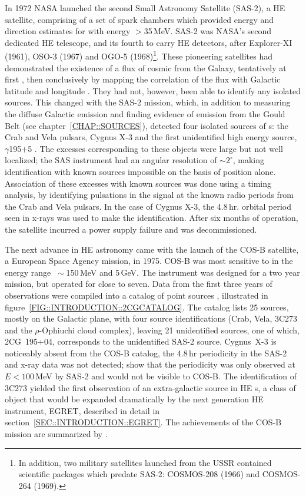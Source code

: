 In 1972 NASA launched the second Small Astronomy Satellite (SAS-2), a
HE \Gray satellite, comprising of a set of spark chambers which
provided energy and direction estimates for \Grays with energy
$>$35\,MeV. SAS-2 was NASA's second dedicated HE \Gray telescope, and
its fourth to carry HE \Gray detectors, after Explorer-XI
(1961), OSO-3 (1967) and OGO-5 (1968)\footnote{In addition, two
military satellites launched from the USSR contained scientific
\Gray packages which predate SAS-2: COSMOS-208 (1966) and COSMOS-264
(1969).}. These pioneering satellites had demonstrated the existence
of a flux of cosmic \Grays from the Galaxy, tentatively at first
\citep{REF::KRAUSHAAR::APJ1965}, then conclusively by mapping the
correlation of the flux with Galactic latitude and longitude
\citep{REF::CLARK::APJ1968}. They had not, however, been able to
identify any isolated \Gray sources.  This changed with the SAS-2
mission, which, in addition to measuring the diffuse Galactic \Gray
emission and finding evidence of emission from the Gould Belt (see
chapter~\ref{CHAP::SOURCES}), detected four isolated sources of
{\Grayc}s: the Crab and Vela pulsars, Cygnus X-3 and the first
unidentified high energy source, $\gamma$195$+$5
\citep{REF::FICHTEL::APJ1975, REF::HARTMAN::APJ1979}. The \Gray
excesses corresponding to these objects were large but not well
localized; the SAS instrument had an angular resolution of
$\sim2^\circ$, making identification with known sources impossible on
the basis of position alone. Association of these excesses with known
sources was done using a timing analysis, by identifying pulsations in
the \Gray signal at the known radio periods from the Crab and Vela
pulsars. In the case of Cygnus X-3, the 4.8\,hr. orbital period seen in
x-rays was used to make the identification. After six months of
operation, the satellite incurred a power supply failure and was
decommissioned.

The next advance in HE \Gray astronomy came with the launch of the
COS-B satellite, a European Space Agency mission, in 1975. COS-B was
most sensitive to \Grays in the energy range $~\sim$150\,MeV and
5\,GeV. The instrument was designed for a two year mission, but
operated for close to seven. Data from the first three years of
observations were compiled into a catalog of point sources
\citep{REF::SWANENBURG::APJ1981}, illustrated in 
figure~\ref{FIG::INTRODUCTION::2CGCATALOG}. The catalog lists 25 sources,
mostly on the Galactic plane, with four source identifications (Crab,
Vela, 3C273 and the $\rho$-Ophiuchi cloud complex), leaving 21
unidentified sources, one of which, 2CG~195$+$04, corresponds to the
unidentified SAS-2 source. Cygnus~X-3 is noticeably absent from the
COS-B catalog, the 4.8\,hr periodicity in the SAS-2 and x-ray data was
not detected; \citet{REF::MATTOX::BAAS1990} show that the periodicity
was only observed at $E<100$\,MeV by SAS-2 and would not be visible to
COS-B. The identification of 3C273 yielded the first observation of an
extra-galactic source in HE {\Grayc}s, a class of object that would be
expanded dramatically by the next generation HE \Gray instrument,
EGRET, described in detail in
section~\ref{SEC::INTRODUCTION::EGRET}. The achievements of the COS-B
mission are summarized by \citet{REF::BENNETT::NPBPS1990}.

